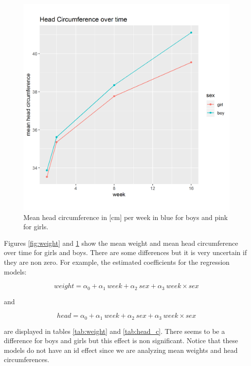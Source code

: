 \documentclass[12pt]{article}
\begin{document}
\begin{figure}[!htb]
  \centering
  \includegraphics[width=\textwidth]{../wANDhc/head_c.png}
  \caption{Mean head circumference in [cm] per week in blue for boys and pink for girls.}
  \label{fig:head_c}
\end{figure}

Figures \ref{fig:weight} and \ref{fig:head_c} show the mean weight and mean head circumference over time for girls and boys. There are some differences but it is very uncertain if they are non zero. For example, the estimated coefficients for the regression models:

\begin{equation*}
weight = \alpha_0 + \alpha_1 \ week + \alpha_2 \ sex + \alpha_3 \ week \times sex
\end{equation*}

and

\begin{equation*}
head = \alpha_0 + \alpha_1 \ week + \alpha_2 \ sex + \alpha_3 \ week \times sex
\end{equation*}

are displayed in tables \ref{tab:weight} and \ref{tab:head_c}. There seems to be a difference for boys and girls but this effect is non significant. Notice that these models do not have an id effect since we are analyzing mean weights and head circumferences.
\end{document}
